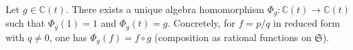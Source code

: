 Let $g \in \mathbb{C}(t)$. There exists a unique algebra homomorphism $\Phi_g: \mathbb{C}(t) \to \mathbb{C}(t)$ such that $\Phi_g(1) = 1$ and $\Phi_g(t) = g$. Concretely, for $f = p/q$ in reduced form with $q \neq 0$, one has $\Phi_g(f) = f \circ g$ (composition as rational functions on $\mathfrak{S}$).
